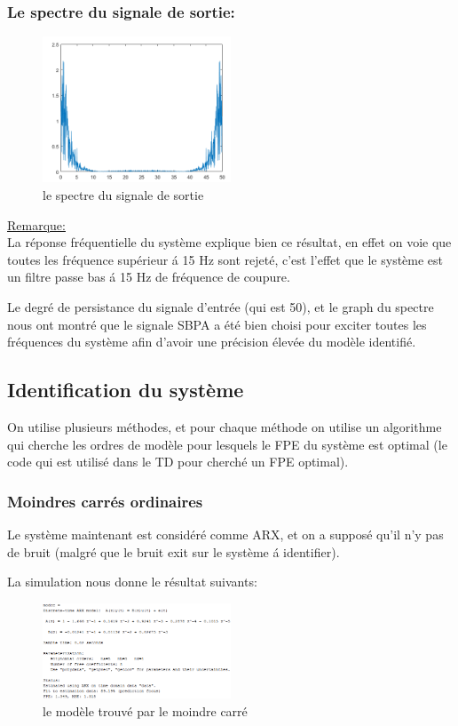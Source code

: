 \documentclass[twoside,twocolumn]{article}
\begin{document}
\subsubsection{Le spectre du signale de sortie:}
\begin{figure}[H]
\centering
\includegraphics[width=0.5\textwidth]{Images/4.png}
\caption{ le spectre du signale de sortie}
\end{figure}
\underline{Remarque:}\\
La réponse fréquentielle du système explique bien ce résultat, en effet on voie que toutes les fréquence supérieur á 15 Hz sont rejeté, c'est l'effet que le système est un filtre passe bas á 15 Hz de fréquence de coupure.

Le degré de persistance du signale d'entrée (qui est 50), et le graph du spectre nous ont montré que le signale SBPA a été bien choisi pour exciter toutes les fréquences du système afin d'avoir une précision élevée du modèle identifié.
\newpage
\subsection{Identification du système}
On utilise plusieurs méthodes, et pour chaque méthode on utilise un algorithme qui cherche les ordres de modèle pour lesquels le FPE du système est optimal (le code qui est utilisé dans le TD pour cherché un FPE optimal).

\subsubsection{Moindres carrés ordinaires}
Le système maintenant est considéré comme ARX, et on a supposé qu'il n'y pas de bruit (malgré que le bruit exit sur le système á identifier).

\label{matlab}

La simulation nous donne le résultat suivants:
\begin{figure}[H]
\centering
\includegraphics[width=0.5\textwidth]{Images/5.png}
\caption{ le modèle trouvé par le moindre carré}
\end{figure}
\end{document}
